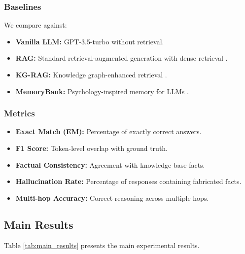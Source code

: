 \documentclass[conference]{IEEEtran}
\begin{document}
\subsubsection{Baselines}

We compare against:
\begin{itemize}
    \item \textbf{Vanilla LLM:} GPT-3.5-turbo without retrieval.
    \item \textbf{RAG:} Standard retrieval-augmented generation with dense retrieval \cite{lewis2020retrieval}.
    \item \textbf{KG-RAG:} Knowledge graph-enhanced retrieval \cite{baek2023knowledge}.
    \item \textbf{MemoryBank:} Psychology-inspired memory for LLMs \cite{zhong2023memorybank}.
\end{itemize}

\subsubsection{Metrics}

\begin{itemize}
    \item \textbf{Exact Match (EM):} Percentage of exactly correct answers.
    \item \textbf{F1 Score:} Token-level overlap with ground truth.
    \item \textbf{Factual Consistency:} Agreement with knowledge base facts.
    \item \textbf{Hallucination Rate:} Percentage of responses containing fabricated facts.
    \item \textbf{Multi-hop Accuracy:} Correct reasoning across multiple hops.
\end{itemize}

\subsection{Main Results}

Table \ref{tab:main_results} presents the main experimental results.
\end{document}
